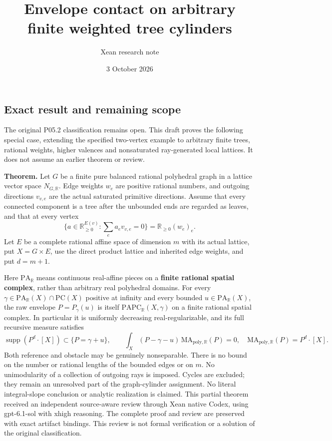 \documentclass[
  11pt,
]{article}
\title{Envelope contact on arbitrary finite weighted tree cylinders}
\author{Xean research note}
\date{3 October 2026}
\begin{document}
\maketitle

\subsection{Exact result and remaining
scope}\label{exact-result-and-remaining-scope}

The original P05.2 classification remains open. This draft proves the
following special case, extending the specified two-vertex example to
arbitrary finite trees, rational weights, higher valences and
nonsaturated ray-generated local lattices. It does not assume an earlier
theorem or review.

\textbf{Theorem.} Let \(G\) be a finite pure balanced rational
polyhedral graph in a lattice vector space \(N_{G,\mathbb R}\). Edge
weights \(w_e\) are positive rational numbers, and outgoing directions
\(v_{v,e}\) are the actual saturated primitive directions. Assume that
every connected component is a tree after the unbounded ends are
regarded as leaves, and that at every vertex \[
\{a\in\mathbb R_{\geq0}^{E(v)}:\sum_ea_ev_{v,e}=0\}
=\mathbb R_{\geq0}(w_e)_e. \tag{1}
\] Let \(E\) be a complete rational affine space of dimension \(m\) with
its actual lattice, put \(X=G\times E\), use the direct product lattice
and inherited edge weights, and put \(d=m+1\).

Here \(\mathrm{PA}_{\mathbb R}\) means continuous real-affine pieces on
a \textbf{finite rational spatial complex}, rather than arbitrary real
polyhedral domains. For every
\(\gamma\in\mathrm{PA}_{\mathbb R}(X)\cap\mathrm{PC}(X)\) positive at
infinity and every bounded \(u\in\mathrm{PA}_{\mathbb R}(X)\), the raw
envelope \(P=P_\gamma(u)\) is itself
\(\mathrm{PAPC}_{\mathbb R}(X,\gamma)\) on a finite rational spatial
complex. In particular it is uniformly decreasing real-regularizable,
and its full recursive measure satisfies \[
\operatorname{supp}(P^d\cdot[X])\subset\{P=\gamma+u\},\qquad
\int_X(P-\gamma-u)\,\mathrm{MA}_{\mathrm{poly},\mathbb R}(P)=0,
\quad \mathrm{MA}_{\mathrm{poly},\mathbb R}(P)=P^d\cdot[X]. \tag{2}
\] Both reference and obstacle may be genuinely nonseparable. There is
no bound on the number or rational lengths of the bounded edges or on
\(m\). No unimodularity of a collection of outgoing rays is imposed.
Cycles are excluded; they remain an unresolved part of the
graph-cylinder assignment. No literal integral-slope conclusion or
analytic realization is claimed. This partial theorem received an independent source-aware review through
Xean native Codex, using gpt-6.1-sol with xhigh reasoning. The complete
proof and review are preserved with exact artifact bindings. This
review is not formal verification or a solution of the original classification.
\end{document}
